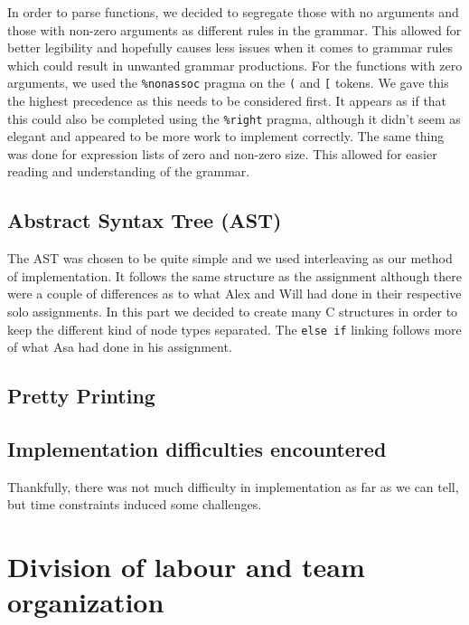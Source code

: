 \documentclass{article}
\begin{document}
In order to parse functions, we decided to segregate those with no arguments and
those with non-zero arguments as different rules in the grammar.
This allowed for better legibility and hopefully
causes less issues when it comes to grammar rules which could result in
unwanted grammar productions. For the functions with zero arguments, we used the
\verb|%nonassoc| pragma on the \verb|(| and \verb|[| tokens. We gave this the
highest precedence as this needs to be considered first.
It appears as if that this could also be completed using
the \verb|%right| pragma, although it didn't
seem as elegant and appeared to be more work to implement correctly. The same
thing was done for expression lists of zero and non-zero size. This allowed for
easier reading and understanding of the grammar.


\subsection{Abstract Syntax Tree (AST)}

The AST was chosen to be quite simple and we used interleaving as our method
of implementation. It follows the same structure as the assignment although
there were a couple of differences as to what Alex and Will had done in their
respective solo assignments. In this part we decided to create many C structures
in order to keep the different kind of node types separated. The \verb|else if|
linking follows more of what Asa had done in his assignment.


\subsection{Pretty Printing}

\subsection{Implementation difficulties encountered}

Thankfully, there was not much difficulty in implementation as far as we can
tell, but time constraints induced some challenges.

\section{Division of labour and team organization}
\end{document}
